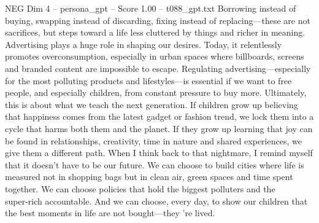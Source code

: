 \begin{textsample}{NEG Dim 4 – persona\_gpt – Score 1.00 – t088\_gpt.txt}
Borrowing instead of buying, swapping instead of discarding, fixing instead of replacing—these are not sacrifices, but steps toward a life less cluttered by things and richer in meaning.
Advertising plays a huge role in shaping our desires.
Today, it relentlessly promotes overconsumption, especially in urban spaces where billboards, screens and branded content are impossible to escape.
Regulating advertising—especially for the most polluting products and lifestyles—is essential if we want to free people, and especially children, from constant pressure to buy more.
Ultimately, this is about what we teach the next generation.
If children grow up believing that happiness comes from the latest gadget or fashion trend, we lock them into a cycle that harms both them and the planet.
If they grow up learning that joy can be found in relationships, creativity, time in nature and shared experiences, we give them a different path.
When I think back to that nightmare, I remind myself that it doesn't have to be our future.
We can choose to build cities where life is measured not in shopping bags but in clean air, green spaces and time spent together.
We can choose policies that hold the biggest polluters and the super‑rich accountable.
And we can choose, every day, to show our children that the best moments in life are not bought—they ’re lived.

\end{textsample}
